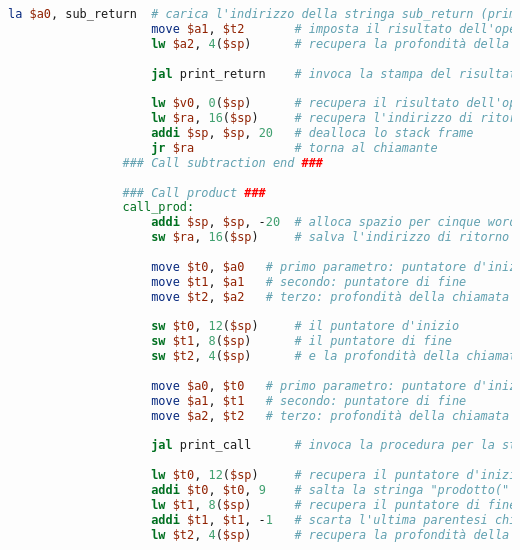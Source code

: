 \begin{center}
\begin{lstlisting}[language=mips, gobble=14, stepnumber=1]
                    la $a0, sub_return  # carica l'indirizzo della stringa sub_return (primo parametro)
                    move $a1, $t2       # imposta il risultato dell'operazione come secondo parametro
                    lw $a2, 4($sp)      # recupera la profondità della chiamata (terzo parametro)
                    
                    jal print_return    # invoca la stampa del risultato con questi tre parametri
                    
                    lw $v0, 0($sp)      # recupera il risultato dell'operazione
                    lw $ra, 16($sp)     # recupera l'indirizzo di ritorno
                    addi $sp, $sp, 20   # dealloca lo stack frame
                    jr $ra              # torna al chiamante
                ### Call subtraction end ###
                
                ### Call product ###
                call_prod:
                    addi $sp, $sp, -20  # alloca spazio per cinque words nello stack frame
                    sw $ra, 16($sp)     # salva l'indirizzo di ritorno nello stack
                    
                    move $t0, $a0   # primo parametro: puntatore d'inizio
                    move $t1, $a1   # secondo: puntatore di fine
                    move $t2, $a2   # terzo: profondità della chiamata
                    
                    sw $t0, 12($sp)     # il puntatore d'inizio
                    sw $t1, 8($sp)      # il puntatore di fine
                    sw $t2, 4($sp)      # e la profondità della chiamata
                    
                    move $a0, $t0   # primo parametro: puntatore d'inizio
                    move $a1, $t1   # secondo: puntatore di fine
                    move $a2, $t2   # terzo: profondità della chiamata
                    
                    jal print_call      # invoca la procedura per la stampa dell'invocazione (con gli stessi parametri)
                    
                    lw $t0, 12($sp)     # recupera il puntatore d'inizio dallo stack
                    addi $t0, $t0, 9    # salta la stringa "prodotto(" (9 caratteri)
                    lw $t1, 8($sp)      # recupera il puntatore di fine
                    addi $t1, $t1, -1   # scarta l'ultima parentesi chiusa
                    lw $t2, 4($sp)      # recupera la profondità della chiamata
                    

\end{lstlisting}
\end{center}
